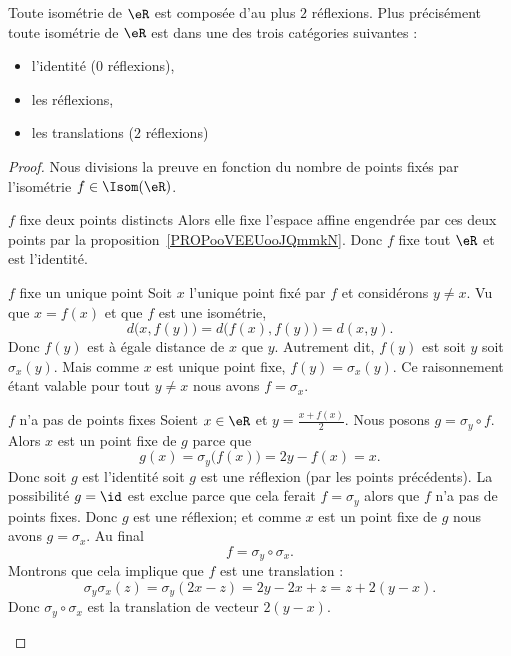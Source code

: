 \begin{theorem}
    Toute isométrie de \( \eR\) est composée d'au plus \( 2\) réflexions. Plus précisément toute isométrie de \( \eR\) est dans une des trois catégories suivantes :
    \begin{itemize}
        \item l'identité (\( 0\) réflexions),
        \item les réflexions,
        \item les translations (\( 2\) réflexions)
    \end{itemize}
\end{theorem}

\begin{proof}
    Nous divisions la preuve en fonction du nombre de points fixés par l'isométrie \( f\in\Isom(\eR)\).
    \begin{subproof}
        \item[\( f\) fixe deux points distincts]
            Alors elle fixe l'espace affine engendrée par ces deux points par la proposition~\ref{PROPooVEEUooJQmmkN}. Donc \( f\) fixe tout \( \eR\) et est l'identité.
        \item[\( f\) fixe un unique point]
            Soit \( x\) l'unique point fixé par \( f\) et considérons \( y\neq x\). Vu que \( x=f(x)\) et que \( f\) est une isométrie,
            \begin{equation}
                d\big( x,f(y) \big)=d\big( f(x),f(y) \big)=d(x,y).
            \end{equation}
            Donc \( f(y)\) est à égale distance de \( x\) que \( y\). Autrement dit, \( f(y)\) est soit \( y\) soit \( \sigma_x(y)\). Mais comme \( x\) est unique point fixe, \( f(y)=\sigma_x(y)\). Ce raisonnement étant valable pour tout \( y\neq x  \) nous avons \( f=\sigma_x\).
        \item[\( f\) n'a pas de points fixes]
            Soient \( x\in \eR\) et \( y=\frac{ x+f(x) }{ 2 }\). Nous posons \( g=\sigma_y\circ f\). Alors \( x\) est un point fixe de \( g\) parce que
            \begin{equation}
                g(x)=\sigma_y\big( f(x) \big)=2y-f(x)=x.
            \end{equation}
            Donc soit \( g\) est l'identité soit \( g\) est une réflexion (par les points précédents). La possibilité \( g=\id\) est exclue parce que cela ferait \( f=\sigma_y\) alors que \( f\) n'a pas de points fixes. Donc \( g\) est une réflexion; et comme \( x\) est un point fixe de \( g\) nous avons \( g=\sigma_x\). Au final
            \begin{equation}
                f=\sigma_y\circ\sigma_x.
            \end{equation}
            Montrons que cela implique que \( f\) est une translation :
            \begin{equation}
                \sigma_y\sigma_x(z)=\sigma_y(2x-z)=2y-2x+z=z+2(y-x).
            \end{equation}
            Donc \( \sigma_y\circ\sigma_x\) est la translation de vecteur \( 2(y-x)\).
    \end{subproof}
\end{proof}


